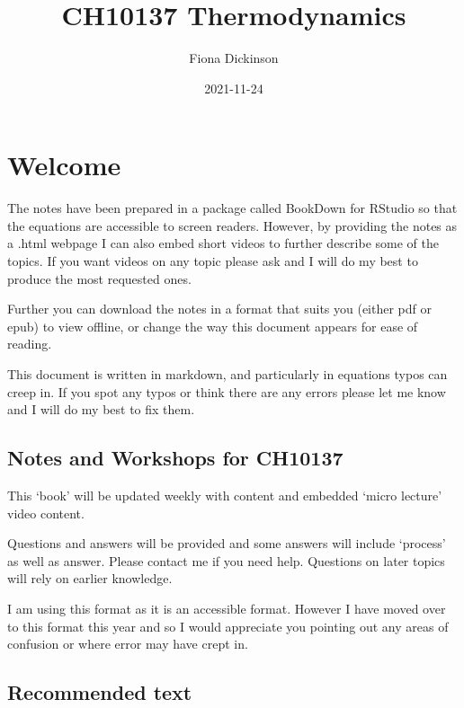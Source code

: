 \documentclass[
]{book}
\title{CH10137 Thermodynamics}
\author{Fiona Dickinson}
\date{2021-11-24}
\begin{document}
\maketitle

{
\setcounter{tocdepth}{1}
\tableofcontents
}
\hypertarget{welcome}{%
\chapter*{Welcome}\label{welcome}}

The notes have been prepared in a package called BookDown for RStudio so that the equations are accessible to screen readers. However, by providing the notes as a .html webpage I can also embed short videos to further describe some of the topics. If you want videos on any topic please ask and I will do my best to produce the most requested ones.

Further you can download the notes in a format that suits you (either pdf or epub) to view offline, or change the way this document appears for ease of reading.

This document is written in markdown, and particularly in equations typos can creep in. If you spot any typos or think there are any errors please let me know and I will do my best to fix them.

\hypertarget{notes-and-workshops-for-ch10137}{%
\section*{Notes and Workshops for CH10137}\label{notes-and-workshops-for-ch10137}}

This `book' will be updated weekly with content and embedded `micro lecture' video content.

Questions and answers will be provided and some answers will include `process' as well as answer. Please contact me if you need help. Questions on later topics will rely on earlier knowledge.

I am using this format as it is an accessible format. However I have moved over to this format this year and so I would appreciate you pointing out any areas of confusion or where error may have crept in.

\hypertarget{recommended-text}{%
\section*{Recommended text}\label{recommended-text}}
\end{document}
